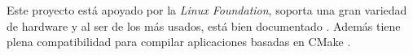 
Este proyecto está apoyado por la \textit{Linux Foundation}, soporta una gran variedad de hardware y al ser de los más usados, está bien documentado \cite{ZephyrTeam2024}. Además tiene plena compatibilidad para compilar aplicaciones basadas en CMake \cite{ZephyrTeam2025}.
